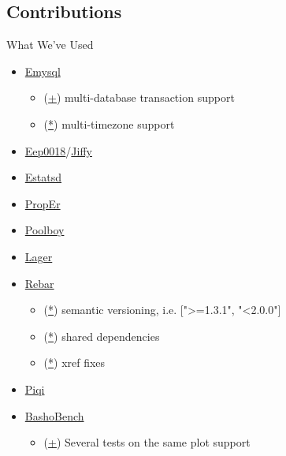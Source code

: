 \documentclass[aspectratio=43]{beamer}
\begin{document}
\subsection{Contributions}
\begin{frame}{What We've Used}
    \begin{itemize}
        \item \href{https://github.com/Eonblast/Emysql}{Emysql}
            \begin{itemize}
                \item
                    (\href{https://github.com/Eonblast/Emysql/commit/df25362f9cde560de680c76780d540afd43109f3}{+}) multi-database transaction support
                \item (\href{https://github.com/Eonblast/Emysql/pull/43}{*}) multi-timezone support
            \end{itemize}
        \item \href{http://github.com/davisp/eep0018}{Eep0018}/\href{http://github.com/davisp/jiffy}{Jiffy}
        \item \href{http://github.com/RJ/estatsd}{Estatsd}
        \item \href{http://github.com/manopapad/proper}{PropEr}
        \item \href{http://github.com/devinus/poolboy}{Poolboy}
        \item \href{http://github.com/basho/lager}{Lager}
        \item \href{http://github.com/basho/rebar}{Rebar}
            \begin{itemize}
                \item (\href{https://github.com/basho/rebar/pull/263}{*}) semantic versioning, i.e. [">=1.3.1", "<2.0.0"]
                \item (\href{https://github.com/basho/rebar/pull/262}{*}) shared dependencies
                \item (\href{https://github.com/rebar/rebar/pull/65}{*}) xref fixes
            \end{itemize}
        \item \href{http://github.com/alavrik/piqi}{Piqi}
        \item \href{http://github.com/basho/basho\_bench}{BashoBench}
            \begin{itemize}
                \item (\href{https://github.com/basho/basho\_bench/pull/67}{+}) Several tests on the same plot support
            \end{itemize}
    \end{itemize}
\end{frame}
\end{document}
